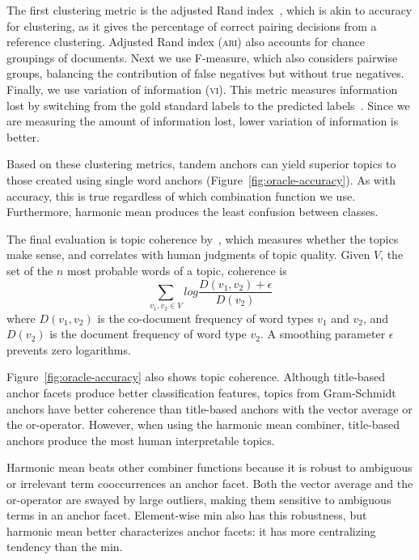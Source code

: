 The first clustering metric is the adjusted Rand index~\cite{ari},
which is akin to accuracy for clustering, as it gives the percentage of
correct pairing decisions from a reference clustering.
Adjusted Rand index (\textsc{ari}) also accounts for chance groupings of documents.
Next we use F-measure, which also considers pairwise groups, balancing the
contribution of false negatives but without true negatives.
Finally, we use variation of information (\textsc{vi}).
This metric measures information lost by switching from the gold
standard labels to the predicted labels~\cite{vi}.
Since we are measuring the amount of information lost, lower variation of
information is better.

Based on these clustering metrics, tandem anchors can yield
superior topics to those created using single word anchors
(Figure~\ref{fig:oracle-accuracy}).
As with accuracy, this is true regardless of which combination function we use.
Furthermore, harmonic mean produces the least confusion between
classes.\statsigoracle{}

The final evaluation is topic coherence by~, which
measures whether the topics make sense, and correlates with human judgments of
topic quality.
Given $V$, the set of the $n$ most probable words of a topic, coherence is
\begin{equation}
\sum_{v_1, v_2 \in V} log \frac{D(v_1, v_2) + \epsilon}{D(v_2)}
\label{eq:coherence}
\end{equation}
where $D(v_1, v_2)$ is the co-document frequency of word types
$v_1$ and $v_2$, and $D(v_2)$ is the document frequency of word type $v_2$.
A smoothing parameter $\epsilon$ prevents zero logarithms.

Figure~\ref{fig:oracle-accuracy} also shows topic
coherence.
Although title-based anchor facets produce better classification features,
topics from Gram-Schmidt anchors have better coherence than
title-based anchors with the vector average or the or-operator.
However, when using the harmonic mean combiner, title-based anchors produce
the most human interpretable topics.\statsigoracle{}


Harmonic mean beats other combiner functions because it is robust
to ambiguous or irrelevant term cooccurrences an anchor facet.
Both the vector average and the or-operator are swayed by large
outliers, making them sensitive to ambiguous terms in an anchor facet.
Element-wise min also has this robustness, but harmonic mean better
characterizes anchor facets: it has more centralizing tendency than the
min.


